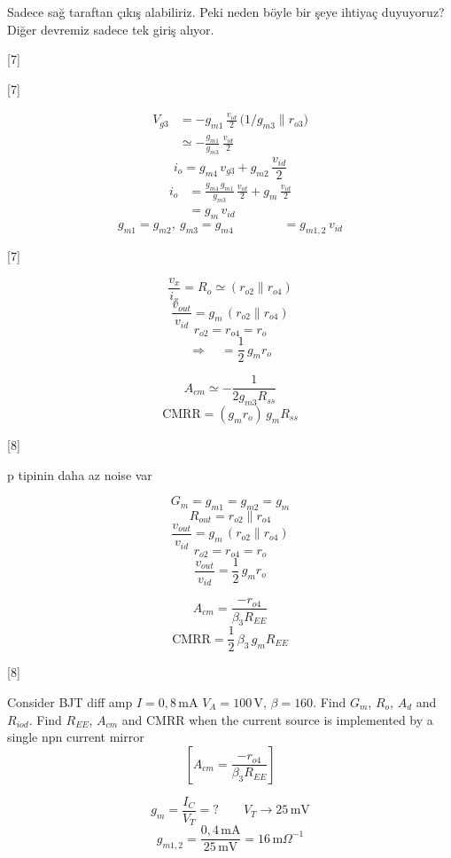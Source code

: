 \documentclass[11pt,a4paper]{article}
\begin{document}
Sadece sağ taraftan çıkış alabiliriz. Peki neden böyle bir şeye ihtiyaç duyuyoruz? Diğer devremiz sadece tek giriş alıyor. 

[7]

[7]

\begin{align*}
V_{g3} &= -g_{m1}\,\frac{v_{id}}{2}\,\bigl(1/g_{m3} \parallel r_{o3}\bigr) \\
&\simeq -\frac{g_{m1}}{g_{m3}}\,\frac{v_{id}}{2}
\end{align*}
\[ i_o = g_{m4}\,v_{g3} + g_{m2}\,\frac{v_{id}}{2} \]
\begin{align*}
i_o &= \frac{g_{m4}\,g_{m1}}{g_{m3}}\,\frac{v_{id}}{2} + g_m\,\frac{v_{id}}{2} \\
&= g_m\,v_{id}
\end{align*}
\[ g_{m1} = g_{m2},\ g_{m3} = g_{m4} \qquad\qquad = g_{m1,2}\,v_{id} \]

[7]

\[ \frac{v_x}{i_x} = R_o \simeq (r_{o2} \parallel r_{o4}) \]
\[ \frac{v_{out}}{v_{id}} = g_m\,(r_{o2} \parallel r_{o4}) \]
\[ r_{o2} = r_{o4} = r_o \]
\[ \Rightarrow\quad = \frac{1}{2}\,g_m r_o \]

\[ A_{cm} \simeq -\frac{1}{2g_{m3}R_{ss}} \]
\[ \mathrm{CMRR} = (g_m r_o)\,g_m R_{ss} \]

[8]

p tipinin daha az noise var

\[ G_m = g_{m1} = g_{m2} = g_m \]
\[ R_{out} = r_{o2} \parallel r_{o4} \]
\[ \frac{v_{out}}{v_{id}} = g_m\,(r_{o2} \parallel r_{o4}) \]
\[ r_{o2} = r_{o4} = r_o \]
\[ \frac{v_{out}}{v_{id}} = \frac{1}{2}\,g_m r_o \]

\[ A_{cm} = \frac{-r_{o4}}{\beta_3 R_{EE}} \]
\[ \mathrm{CMRR} = \frac{1}{2}\,\beta_3\,g_m R_{EE} \]

[8]

Consider BJT diff amp $I = 0{,}8\,\mathrm{mA}$ \quad $V_A = 100\,\mathrm{V}$, $\beta = 160$. Find $G_m$, $R_o$, $A_d$ and $R_{iod}$. Find $R_{EE}$, $A_{cm}$ and CMRR when the current source is implemented by a single npn current mirror
\[ \left[ A_{cm} = \frac{-r_{o4}}{\beta_3 R_{EE}} \right] \]

\[ g_m = \frac{I_C}{V_T} = ? \qquad V_T \to 25\,\mathrm{mV} \]
\[ g_{m1,2} = \frac{0{,}4\,\mathrm{mA}}{25\,\mathrm{mV}} = 16\,\mathrm{m}\Omega^{-1} \]
\end{document}
